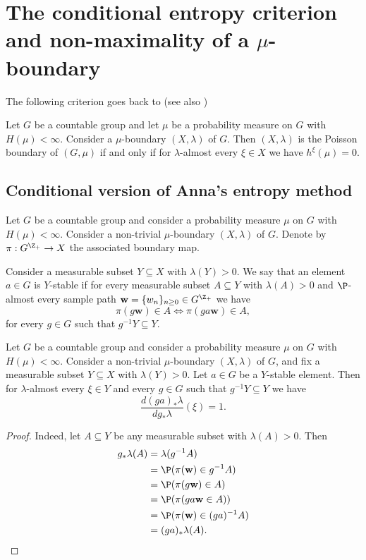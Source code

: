 \section{The conditional entropy criterion and non-maximality of a $\mu$-boundary}

The following criterion goes back to \cite[Theorem 2]{Kaimanovich1985} (see also \cite[Theorem 4.6]{Kaimanovich2000})
\begin{thm} Let $G$ be a countable group and let $\mu$ be a probability measure on $G$ with $H(\mu)<\infty$. Consider a $\mu$-boundary $(X,\lambda)$ of $G$. Then $(X,\lambda)$ is the Poisson boundary of $(G,\mu)$ if and only if for $\lambda$-almost every $\xi\in X$ we have $h^{\xi}(\mu)=0$.
\end{thm}


\subsection{Conditional version of Anna's entropy method}
\begin{defn}
	Let $G$ be a countable group and consider a probability measure $\mu$ on $G$ with $H(\mu)<\infty$. Consider a non-trivial $\mu$-boundary $(X,\lambda)$ of $G$. Denote by $\pi:G^{\Z_{+}}\to X$ the associated boundary map.
	
	Consider a measurable subset $Y\subseteq X$ with $\lambda(Y)>0$. We say that an element $a\in G$ is $Y$-stable if for every measurable subset $A\subseteq Y$ with $\lambda(A)>0$ and $\P$-almost every sample path $\mathbf{w}=\{w_n\}_{n\ge 0}\in G^{\Z_{+}}$ we have
	\[
	\pi(g\mathbf{w})\in A \Longleftrightarrow \pi (ga\mathbf{w}) \in A,
	\]
	for every $g\in G$ such that $g^{-1}Y\subseteq Y$.
\end{defn}

\begin{lem}\label{lem: invariant Radon nykodym derivative}
	Let $G$ be a countable group and consider a probability measure $\mu$ on $G$ with $H(\mu)<\infty$. Consider a non-trivial $\mu$-boundary $(X,\lambda)$ of $G$, and fix a measurable subset $Y\subseteq X$ with $\lambda(Y)>0$. Let $a\in G$ be a $Y$-stable element. Then for $\lambda$-almost every $\xi \in Y$ and every $g\in G$ such that $g^{-1}Y\subseteq Y$ we have
	\[
	\frac{d(ga)_{*}\lambda}{dg_{*}\lambda}(\xi)=1.
	\] 
\end{lem}
\begin{proof}
	Indeed, let $A\subseteq Y$ be any measurable subset with $\lambda(A)>0$. Then
	\begin{align*}
	g_{*}\lambda(A)&=\lambda(g^{-1}A)\\
	&=\P(\pi(\mathbf{w})\in g^{-1}A)\\
	&=\P(\pi(g\mathbf{w})\in A)\\
	&=\P(\pi(ga\mathbf{w}\in A))\\
	&=\P(\pi(\mathbf{w})\in (ga)^{-1}A)\\
	&=(ga)_{*}\lambda(A).
	\end{align*}
\end{proof}

